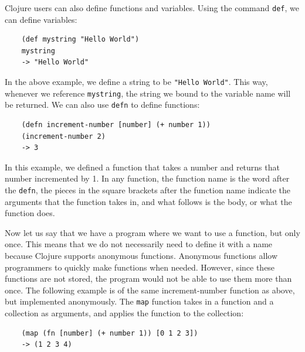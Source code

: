 \documentclass[12pt]{article}
\newcommand{\comment}[1]{{\bf \tt  {#1}}}
\newcommand{\emcomment}[1]{\textcolor{ForestGreen}{\comment{Elena: {#1}}}}
\begin{document}

Clojure users can also define functions and variables.
Using the command \texttt{def}, we can define variables:
\begin{verbatim}
	(def mystring "Hello World")
	mystring
	-> "Hello World"
\end{verbatim}

In the above example, we define a string to be \texttt{"Hello World"}. This way, 
whenever we reference 
\texttt{mystring}, the string we bound to the variable name will be returned. We can 
also use
\texttt{defn} to define functions:
\begin{verbatim}
	(defn increment-number [number] (+ number 1))
	(increment-number 2)
	-> 3
\end{verbatim}

In this example, we defined
a function that takes a number and returns that number incremented by 1.
In any function, the function name is the word after the \texttt{defn}, the pieces in 
the square
brackets after the function name indicate 
the arguments that the function takes in, and what follows is the body, or what the 
function does.

Now let us say that we have a program where we want to use a function, but only once. 
This means that
we do not necessarily need to define it with a name because Clojure supports anonymous 
functions.
Anonymous functions allow programmers to quickly make
functions when needed. 
However, since these functions are not  stored, the program would not be able to use 
them more than
once. 
The following example is of the same increment-number function as above, but implemented 
anonymously.
The \texttt{map} function takes in a function and a collection as arguments, and applies 
the function
to the collection: 
\begin{verbatim}
	(map (fn [number] (+ number 1)) [0 1 2 3])
	-> (1 2 3 4)
\end{verbatim}
\end{document}
